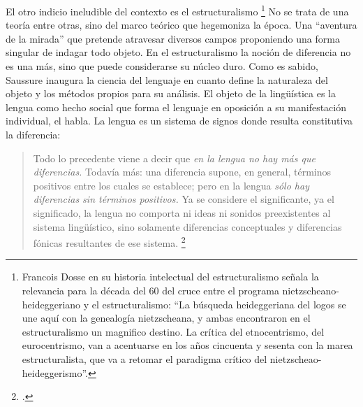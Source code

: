 El otro indicio ineludible del contexto es el estructuralismo \footnote{Francois Dosse en su historia intelectual del estructuralismo señala la relevancia para la década del 60 del cruce entre el programa nietzscheano-heideggeriano y el estructuralismo: \enquote{La búsqueda heideggeriana del logos se une aquí con la genealogía nietzscheana, y ambas encontraron en el estructuralismo un magnifico destino. La crítica del etnocentrismo, del eurocentrismo, van a acentuarse en los años cincuenta y sesenta con la marea estructuralista, que va a retomar el paradigma crítico del nietzscheao-heideggerismo}.} No se trata de una teoría entre otras, sino del marco teórico que hegemoniza la época. Una \enquote{aventura de la mirada} que pretende atravesar diversos campos proponiendo una forma singular de indagar todo objeto. En el estructuralismo la noción de diferencia no es una más, sino que puede considerarse su núcleo duro. Como es sabido, Saussure inaugura la ciencia del lenguaje en cuanto define la naturaleza del objeto y los métodos propios para su análisis. El objeto de la lingüística es la lengua como hecho social que forma el lenguaje en oposición a su manifestación individual, el habla. La lengua es un sistema de signos donde resulta constitutiva la diferencia:

\begin{quote}
Todo lo precedente viene a decir que \emph{en la lengua no hay más que diferencias.} Todavía más: una diferencia supone, en general, términos positivos entre los cuales se establece; pero en la lengua \emph{sólo hay diferencias sin términos positivos.} Ya se considere el significante, ya el significado, la lengua no comporta ni ideas ni sonidos preexistentes al sistema lingüístico, sino solamente diferencias conceptuales y diferencias fónicas resultantes de ese sistema. \footcite[144]{@6968-SAUSSURE1945}
\end{quote}

